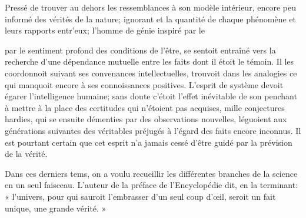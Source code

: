 \documentclass[11pt,a4paper]{article}
\begin{document}
Pressé de trouver au dehors les ressemblances à son modèle intérieur,
 encore peu informé des vérités de la nature; ignorant et
la quantité de chaque phénomène et leurs rapports entr'eux; l'homme de
génie inspiré par le

par le sentiment profond des conditions de l'être, se sentoit entraîné
vers la recherche d'une dépendance mutuelle entre les faits dont il
étoit le témoin. Il les coordonnoit suivant ses convenances
intellectuelles,   trouvoit dans les
analogies ce qui manquoit encore à ses connoissances positives.
L'esprit de système  devoit égarer l'intelligence
humaine;  sans doute  c'étoit \struck{\ill{}} l'effet inévitable de
son penchant à mettre  à la place des
certitudes qui n'étoient pas acquises, mille conjectures hardies, qui
se  ensuite démenties par des observations nouvelles,
 léguoient aux générations
suivantes des  véritables préjugés à l'égard des faits
encore inconnus. Il est pourtant certain que cet esprit n'a jamais
cessé d'être guidé par la prévision de la vérité.

Dans ces derniers tems, on a voulu recueillir les différentes branches
de la science en un seul faisceau. L'auteur de la préface de
 l'Encyclopédie dit, en la terminant:
« l'univers, pour qui sauroit l'embrasser d'un seul coup d'œil,
seroit un fait unique, une grande vérité. »
\end{document}
